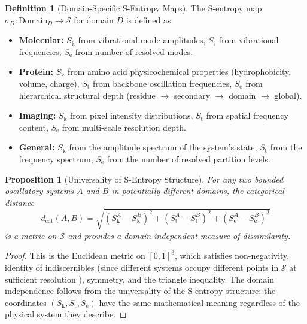 \documentclass[11pt,twocolumn,a4paper]{article}
\newtheorem{proposition}[theorem]{Proposition}
\theoremstyle{definition}
\newtheorem{definition}[theorem]{Definition}
\theoremstyle{remark}
\newcommand{\dcat}{d_{\mathrm{cat}}}
\newcommand{\Sk}{S_{\mathrm{k}}}
\newcommand{\St}{S_{\mathrm{t}}}
\newcommand{\Se}{S_{\mathrm{e}}}
\newcommand{\Sspace}{\mathcal{S}}
\begin{document}
\begin{definition}[Domain-Specific S-Entropy Maps]
\label{def:domain_maps}
The S-entropy map $\sigma_D: \text{Domain}_D \to \Sspace$ for domain $D$ is defined as:
\begin{itemize}[nosep]
\item \textbf{Molecular:} $\Sk$ from vibrational mode amplitudes, $\St$ from vibrational frequencies, $\Se$ from number of resolved modes.
\item \textbf{Protein:} $\Sk$ from amino acid physicochemical properties (hydrophobicity, volume, charge), $\St$ from backbone oscillation frequencies, $\Se$ from hierarchical structural depth (residue $\to$ secondary $\to$ domain $\to$ global).
\item \textbf{Imaging:} $\Sk$ from pixel intensity distributions, $\St$ from spatial frequency content, $\Se$ from multi-scale resolution depth.
\item \textbf{General:} $\Sk$ from the amplitude spectrum of the system's state, $\St$ from the frequency spectrum, $\Se$ from the number of resolved partition levels.
\end{itemize}
\end{definition}

\begin{proposition}[Universality of S-Entropy Structure]
\label{prop:universality}
For any two bounded oscillatory systems $A$ and $B$ in potentially different domains, the categorical distance
\[
\dcat(A, B) = \sqrt{(\Sk^A - \Sk^B)^2 + (\St^A - \St^B)^2 + (\Se^A - \Se^B)^2}
\]
is a metric on $\Sspace$ and provides a domain-independent measure of dissimilarity.
\end{proposition}

\begin{proof}
This is the Euclidean metric on $[0,1]^3$, which satisfies non-negativity, identity of indiscernibles (since different systems occupy different points in $\Sspace$ at sufficient resolution \citep{sachikonye2025a}), symmetry, and the triangle inequality. The domain independence follows from the universality of the S-entropy structure: the coordinates $(\Sk, \St, \Se)$ have the same mathematical meaning regardless of the physical system they describe.
\end{proof}


\end{document}
